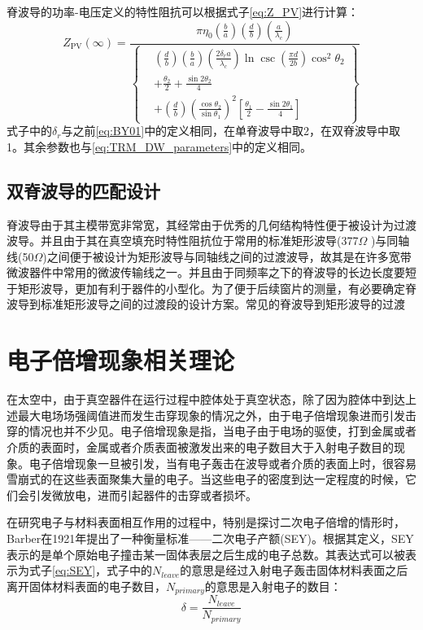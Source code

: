 \documentclass[master]{thesis-uestc}
\begin{document}
脊波导的功率-电压定义的特性阻抗可以根据式子\ref{eq:Z_PV}进行计算：
\begin{equation}\label{eq:Z_PV}
    Z_{\mathrm{PV}}(\infty) = \frac{\pi \eta_0 \left( \frac{b}{a} \right) \left( \frac{d}{b} \right) \left( \frac{a}{\lambda_c} \right)}{
        \left\{ 
            \begin{aligned}
                & \left( \frac{d}{b} \right) \left( \frac{b}{a} \right) \left( \frac{2 \delta_r a}{\lambda_c} \right) \ln \csc \left( \frac{\pi d}{2b} \right) \cos^2 \theta_2 \\
                & + \frac{\theta_2}{2} + \frac{\sin 2\theta_2}{4} \\
                & + \left( \frac{d}{b} \right) \left( \frac{\cos \theta_2}{\sin \theta_1} \right)^2 \left[ \frac{\theta_1}{2} - \frac{\sin 2\theta_1}{4} \right]
            \end{aligned}
        \right\}
    }
\end{equation}
式子中的$\delta_{r}$与之前\ref{eq:BY01}中的定义相同，在单脊波导中取2，在双脊波导中取1。其余参数也与\ref{eq:TRM_DW_parameters}中的定义相同。
\subsection{双脊波导的匹配设计}
脊波导由于其主模带宽非常宽，其经常由于优秀的几何结构特性便于被设计为过渡波导。并且由于其在真空填充时特性阻抗位于常用的标准矩形波导(377$\Omega$ )与同轴线(50$\Omega$)之间便于被设计为矩形波导与同轴线之间的过渡波导，故其是在许多宽带微波器件中常用的微波传输线之一。并且由于同频率之下的脊波导的长边长度要短于矩形波导，更加有利于器件的小型化。为了便于后续窗片的测量，有必要确定脊波导到标准矩形波导之间的过渡段的设计方案。常见的脊波导到矩形波导的过渡

\section{电子倍增现象相关理论}\label{sec:电子倍增现象理论}
在太空中，由于真空器件在运行过程中腔体处于真空状态，除了因为腔体中到达上述最大电场场强阈值进而发生击穿现象的情况之外，由于电子倍增现象进而引发击穿的情况也并不少见。电子倍增现象是指，当电子由于电场的驱使，打到金属或者介质的表面时，金属或者介质表面被激发出来的电子数目大于入射电子数目的现象。电子倍增现象一旦被引发，当有电子轰击在波导或者介质的表面上时，很容易雪崩式的在这些表面聚集大量的电子。当这些电子的密度到达一定程度的时候，它们会引发微放电，进而引起器件的击穿或者损坏。

在研究电子与材料表面相互作用的过程中，特别是探讨二次电子倍增的情形时，Barber在1921年提出了一种衡量标准——二次电子产额(SEY)。根据其定义，SEY表示的是单个原始电子撞击某一固体表层之后生成的电子总数。其表达式可以被表示为式子\ref{eq:SEY}，式子中的$N_{leave}$的意思是经过入射电子轰击固体材料表面之后离开固体材料表面的电子数目，$N_{primary}$的意思是入射电子的数目：
\begin{equation}\label{eq:SEY}
    \delta = \frac{N_{leave}}{N_{primary}}
\end{equation}
\end{document}
